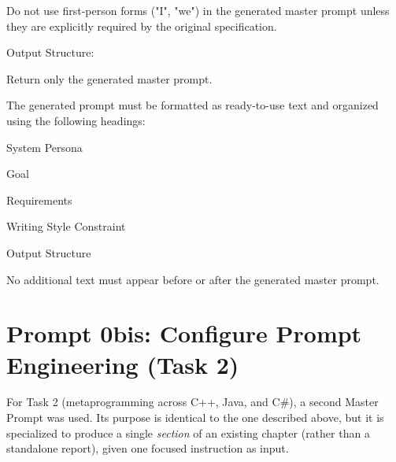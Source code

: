 \documentclass[11pt]{report}
\begin{document}
\begin{PromptVerbatim}
Do not use first-person forms ("I", "we") in the generated master prompt unless
they are explicitly required by the original specification.

Output Structure:

Return only the generated master prompt.

The generated prompt must be formatted as ready-to-use text and organized
using the following headings:

System Persona

Goal

Requirements

Writing Style Constraint

Output Structure

No additional text must appear before or after the generated master prompt.
\end{PromptVerbatim}

\section{Prompt 0bis: Configure Prompt Engineering (Task 2)}
\label{Prompt 0 Task2}

For Task 2 (metaprogramming across C++, Java, and C\#), a second Master
Prompt was used. Its purpose is identical to the one described above, but it
is specialized to produce a single \emph{section} of an existing chapter
(rather than a standalone report), given one focused instruction as input.
\end{document}
